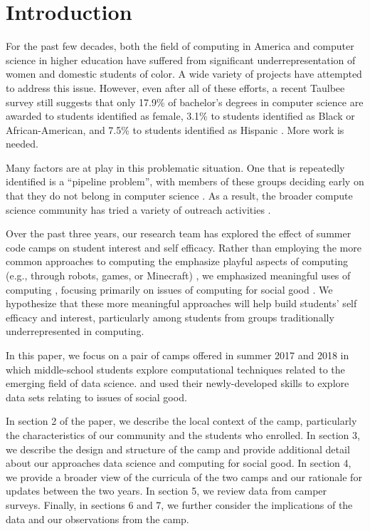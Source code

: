 \section{Introduction}

For the past few decades, both the field of computing in America and
computer science in higher education have suffered from significant
underrepresentation of women and domestic students of color.  A
wide variety of projects have attempted to address this issue.
However, even after all of these efforts, a recent Taulbee survey
still suggests that only 17.9\% of bachelor's degrees in computer
science are awarded to students identified as female, 3.1\% to
students identified as Black or African-American, and 7.5\% to
students identified as Hispanic \cite{Taulbee2016}.  More work is
needed.

Many factors are at play in this problematic situation.  One that
is repeatedly identified is a ``pipeline problem'', with members
of these groups deciding early on that they do not belong in computer
science \cite{Gurer2002}.  As a result, the broader compute science
community has tried a variety of outreach activities
\cite{McGill2015,Decker2016}.

Over the past three years, our research team has explored the effect
of summer code camps on student interest and self efficacy.  Rather
than employing the more common approaches to computing the emphasize
playful aspects of computing (e.g., through robots, games, or
Minecraft) \cite{code-camp-survey-sigcse-2017}, we emphasized
meaningful uses of computing \cite{arts-coding,dssg-sigcse-2018},
focusing primarily on issues of computing for social good
\cite{Goldweber2013}.  We hypothesize that these more meaningful
approaches will help build students' self efficacy and interest,
particularly among students from groups traditionally underrepresented
in computing.

In this paper, we focus on a pair of camps offered in summer 2017
and 2018 in which middle-school students explore computational
techniques related to the emerging field of data science.  and used
their newly-developed skills to explore data sets relating to issues
of social good.

In section 2 of the paper, we describe the local context of the
camp, particularly the characteristics of our community and the
students who enrolled.  In section 3, we describe the design and
structure of the camp and provide additional detail about our
approaches data science and computing for social good.  In section
4, we provide a broader view of the curricula of the two camps and
our rationale for updates between the two years.  In section 5, we
review data from camper surveys.  Finally, in sections 6 and 7, we
further consider the implications of the data and our observations
from the camp.

